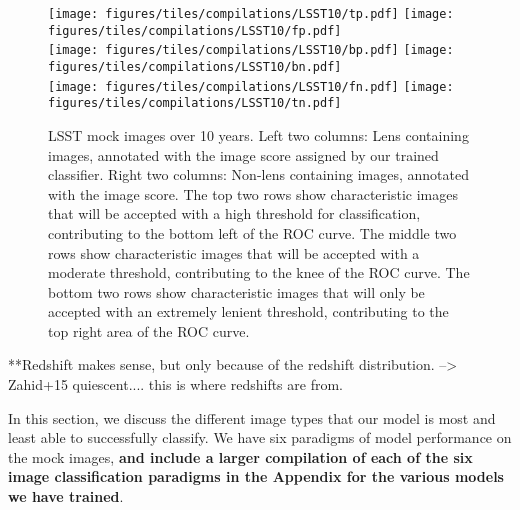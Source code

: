 \documentclass{emulateapj}
\newcommand{\todo}[1]{{\bf\color{blue} #1}}
\begin{document}
\begin{figure*}[t]\label{fig:ROCsamplesLSST10}
\begin{center}
\texttt{[image: figures/tiles/compilations/LSST10/tp.pdf]}\hspace{5pt}
\texttt{[image: figures/tiles/compilations/LSST10/fp.pdf]}\\\vspace{5pt}
\texttt{[image: figures/tiles/compilations/LSST10/bp.pdf]}\hspace{5pt}
\texttt{[image: figures/tiles/compilations/LSST10/bn.pdf]}\\\vspace{5pt}
\texttt{[image: figures/tiles/compilations/LSST10/fn.pdf]}\hspace{5pt}
\texttt{[image: figures/tiles/compilations/LSST10/tn.pdf]}\\
\caption{LSST mock images over 10 years. Left two columns: Lens
  containing images, annotated with the image score assigned by our
  trained classifier.  Right two columns: Non-lens containing images,
  annotated with the image score.  The top two rows show
  characteristic images that will be accepted with a high threshold
  for classification, contributing to the bottom left of the ROC
  curve.  The middle two rows show characteristic images that will be
  accepted with a moderate threshold, contributing to the knee of the
  ROC curve.  The bottom two rows show characteristic images that will
  only be accepted with an extremely lenient threshold, contributing
  to the top right area of the ROC curve.}
\end{center}
\end{figure*}




**Redshift makes sense, but only because of the redshift distribution.
--> Zahid+15 quiescent.... this is where redshifts are from.

In this section, we discuss the different image types that our model
is most and least able to successfully classify.  We have six
paradigms of model performance on the mock images, \todo{and include a
larger compilation of each of the six image classification paradigms
in the Appendix for the various models we have trained}.
\end{document}

